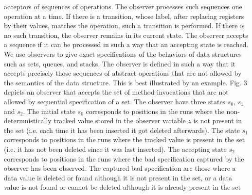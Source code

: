 acceptors of sequences of operations. The observer processes such sequences
one operation at a time. If there is a transition, whose label, after replacing registers by their values, matches the operation, such a transition is performed. If there is no such transition,
the observer remains in its current state. The observer accepts a sequence if it can be
processed in such a way that an accepting state is reached. We use observers to give exact specifications of the behaviors of data structures such as sets, queues, and stacks. The observer is defined in such a way that it accepts
precisely those sequences of abstract operations that are not allowed by the semantics of
the data structure. This is best illustrated by an example. Fig. 3 depicts an observer that
accepts the set of method invocations that are not allowed by sequential specification of a set. The observer have three states $s_0$, $s_1$ and $s_2$. The initial state $s_0$ corresponds to positions in the runs where the non-determnistically tracked value
stored in the observer variable $z$ is not present in the set (i.e.
each time it has been inserted it got deleted afterwards). The
state $s_1$ corresponds to positions in the runs where the tracked
value is present in the set (i.e. it has not been deleted since it
was last inserted). The accepting state $s_2$ corresponds to positions
in the runs where the bad specification captured by the observer has been observed. The captured bad specification are those where
a data value is deleted or found although it is not present in the set, or a data value is not found or cannot be deleted although it is already present in the set

